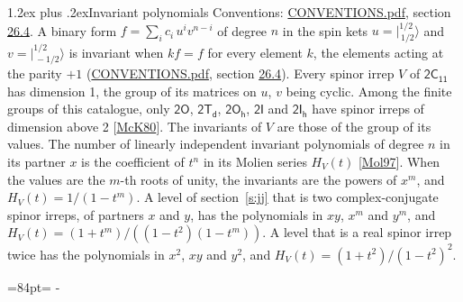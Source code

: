 \documentclass[10pt,a4paper]{article}
\makeatletter
\renewcommand\section{\@startsection{section}{1}{\z@}{-3ex plus -1ex minus -.2ex}%
  {1.2ex plus .2ex}{\normalfont\large\sffamily\bfseries\color{parttitle}}}
\newcommand{\needspace}[1]{\par\penalty-100\begingroup\dimen0=#1\relax\dimen2=\pagegoal
  \advance\dimen2-\pagetotal\ifdim\dimen0>\dimen2\relax\ifdim\dimen2>0pt\vfil\break\fi\fi
  \endgroup}
\numberwithin{equation}{section}
\newcommand{\grp}[1]{\mathsf{#1}}
\newcommand{\jm}[2]{\bigl\lvert{}^{#1}_{\,#2}\bigr\rangle}
\makeatother
\begin{document}
\section{Invariant polynomials}\label{s:invariants}
Conventions: \href{../../CONVENTIONS.pdf}{CONVENTIONS.pdf}, section \href{../../CONVENTIONS.pdf\#conv.26.4}{26.4}.
\leavevmode\label{n:local.binary.form}A binary form $f = \sum_i c_i\, u^i v^{n-i}$ of degree $n$ in the spin kets $u = \jm{1/2}{1/2}$ and $v = \jm{1/2}{-1/2}$ is invariant when $k f = f$ for every element $k$, the elements acting at the parity $+1$ (\href{../../CONVENTIONS.pdf}{CONVENTIONS.pdf}, section \href{../../CONVENTIONS.pdf\#conv.26.4}{26.4}).
\leavevmode\label{n:function.hilbert}Every spinor irrep $V$ of $\grp{2C_{11}}$ has dimension 1, the group of its matrices on $u$, $v$ being cyclic. Among the finite groups of this catalogue, only $\grp{2O}$, $\grp{2T_{d}}$, $\grp{2O_{h}}$, $\grp{2I}$ and $\grp{2I_{h}}$ have spinor irreps of dimension above 2 [\href{../../../REFERENCES.pdf\#ref.McK80}{McK80}]. The invariants of $V$ are those of the group of its values. \label{n:local.partner.x}The number of linearly independent invariant polynomials of degree $n$ in its partner $x$ is the coefficient of $t^n$ in its Molien series $H_V(t)$ [\href{../../../REFERENCES.pdf\#ref.Mol97}{Mol97}]. When the values are the $m$-th roots of unity, the invariants are the powers of $x^{m}$, and $H_V(t) = 1/(1 - t^{m})$. A level of section~\ref{s:jj} that is two complex-conjugate spinor irreps, of partners $x$ and $y$, has the polynomials in $xy$, $x^{m}$ and $y^{m}$, and $H_V(t) = (1 + t^{m})/((1 - t^{2})(1 - t^{m}))$. A level that is a real spinor irrep twice has the polynomials in $x^{2}$, $xy$ and $y^{2}$, and $H_V(t) = (1 + t^{2})/(1 - t^{2})^{2}$.
\needspace{84pt}
\end{document}
